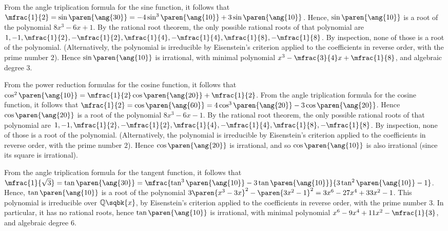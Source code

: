 From the angle triplication formula for the sine function, it follows that
$\mfrac{1}{2} = \sin\paren{\ang{30}} = - 4 \sin^3\paren{\ang{10}} + 3 \sin\paren{\ang{10}}$.
Hence, $\sin\paren{\ang{10}}$ is a root of the polynomial $8 x^3 - 6 x + 1$.
By the rational root theorem, the only possible rational roots of that polynomial are
$1, -1, \mfrac{1}{2}, - \mfrac{1}{2}, \mfrac{1}{4}, - \mfrac{1}{4}, \mfrac{1}{8}, - \mfrac{1}{8}$.
By inspection, none of those is a root of the polynomial.
(Alternatively, the polynomial is irreducible by Eisenstein's criterion
applied to the coefficients in reverse order, with the prime number $2$).
Hence $\sin\paren{\ang{10}}$ is irrational,
with minimal polynomial $x^3 - \mfrac{3}{4} x + \mfrac{1}{8}$,
and algebraic degree $3$.

From the power reduction formulas for the cosine function, it follows that
$\cos^2\paren{\ang{10}} = \mfrac{1}{2} \cos\paren{\ang{20}} + \mfrac{1}{2}$.
From the angle triplication formula for the cosine function, it follows that
$\mfrac{1}{2} = \cos\paren{\ang{60}} = 4 \cos^3\paren{\ang{20}} - 3 \cos\paren{\ang{20}}$.
Hence $\cos\paren{\ang{20}}$ is a root of the polynomial $8 x^3 - 6 x - 1$.
By the rational root theorem, the only possible rational roots of that polynomial are
$1, -1, \mfrac{1}{2}, - \mfrac{1}{2}, \mfrac{1}{4}, - \mfrac{1}{4}, \mfrac{1}{8}, - \mfrac{1}{8}$.
By inspection, none of those is a root of the polynomial.
(Alternatively, the polynomial is irreducible by Eisenstein's criterion
applied to the coefficients in reverse order, with the prime number $2$).
Hence $\cos\paren{\ang{20}}$ is irrational,
and so $\cos\paren{\ang{10}}$ is also irrational (since its square is irrational).

From the angle triplication formula for the tangent function, it follows that
$\mfrac{1}{\sqrt{3}} = \tan\paren{\ang{30}}
  = \mfrac{\tan^3\paren{\ang{10}} - 3 \tan\paren{\ang{10}}}
          {3 \tan^2\paren{\ang{10}} - 1}$.
Hence, $\tan\paren{\ang{10}}$ is a root of the polynomial
$3 \paren{x^3 - 3 x}^2 - \paren{3 x^2 - 1}^2
 = 3 x^6 - 27 x^4 + 33 x^2 - 1$.
This polynomial is irreducible over $\mathbb{Q}\sqbk{x}$,
by Eisenstein's criterion applied to the coefficients in reverse order, with the prime number $3$.
In particular, it has no rational roots,
hence $\tan\paren{\ang{10}}$ is irrational,
with minimal polynomial $x^6 - 9 x^4 + 11 x^2 - \mfrac{1}{3}$,
and algebraic degree $6$.

